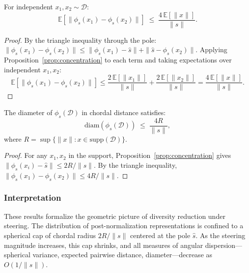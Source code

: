 \begin{corollary}
\label{cor:pairwise-expected}
For independent $x_1, x_2 \sim \mathcal{D}$:
%
\begin{equation}
  \mathbb{E}\!\left[\|\phi_s(x_1) - \phi_s(x_2)\|\right]
  \;\leq\;
  \frac{4\,\mathbb{E}[\|x\|]}{\|s\|}.
  \label{eq:pairwise-expected}
\end{equation}
\end{corollary}

\begin{proof}
By the triangle inequality through the pole:
$\|\phi_s(x_1) - \phi_s(x_2)\| \leq \|\phi_s(x_1) - \hat{s}\| + \|\hat{s} - \phi_s(x_2)\|$.
Applying Proposition~\ref{prop:concentration} to each term and taking expectations
over independent $x_1, x_2$:
%
\begin{equation}
  \mathbb{E}\!\left[\|\phi_s(x_1) - \phi_s(x_2)\|\right]
  \leq \frac{2\,\mathbb{E}[\|x_1\|]}{\|s\|} + \frac{2\,\mathbb{E}[\|x_2\|]}{\|s\|}
  = \frac{4\,\mathbb{E}[\|x\|]}{\|s\|}.
\end{equation}
\end{proof}

\begin{corollary}
\label{cor:diameter}
The diameter of $\phi_s(\mathcal{D})$ in chordal distance satisfies:
%
\begin{equation}
  \mathrm{diam}\!\left(\phi_s(\mathcal{D})\right)
  \;\leq\;
  \frac{4R}{\|s\|},
  \label{eq:diameter}
\end{equation}
%
where $R = \sup\{\|x\| : x \in \mathrm{supp}(\mathcal{D})\}$.
\end{corollary}

\begin{proof}
For any $x_1, x_2$ in the support, Proposition~\ref{prop:concentration} gives
$\|\phi_s(x_i) - \hat{s}\| \leq 2R/\|s\|$.
By the triangle inequality,
$\|\phi_s(x_1) - \phi_s(x_2)\| \leq 4R/\|s\|$.
\end{proof}

\subsubsection{Interpretation}

These results formalize the geometric picture of diversity reduction
under steering.
The distribution of post-normalization representations is confined to a
spherical cap of chordal radius $2R/\|s\|$ centered at the pole $\hat{s}$.
As the steering magnitude increases, this cap shrinks, and all measures
of angular dispersion---spherical variance, expected pairwise distance,
diameter---decrease as $O(1/\|s\|)$.

